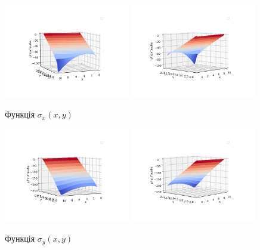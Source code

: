 \begin{figure}[h!]
    \begin{center}
        \includegraphics[width=0.49\textwidth, scale=1]{images/results/static_1/function_sigma_x_1.png}
        \includegraphics[width=0.49\textwidth, scale=1]{images/results/static_1/function_sigma_x_2.png}
        \caption{Функція $\sigma_x(x, y)$}\label{static_1_sigma_x_1}
    \end{center}
\end{figure}
\begin{figure}[h!]
    \begin{center}
        \includegraphics[width=0.49\textwidth, scale=1]{images/results/static_1/function_sigma_y_1.png}
        \includegraphics[width=0.49\textwidth, scale=1]{images/results/static_1/function_sigma_y_2.png}
        \caption{Функція $\sigma_y(x, y)$}\label{static_1_sigma_y_1}
    \end{center}
\end{figure}
